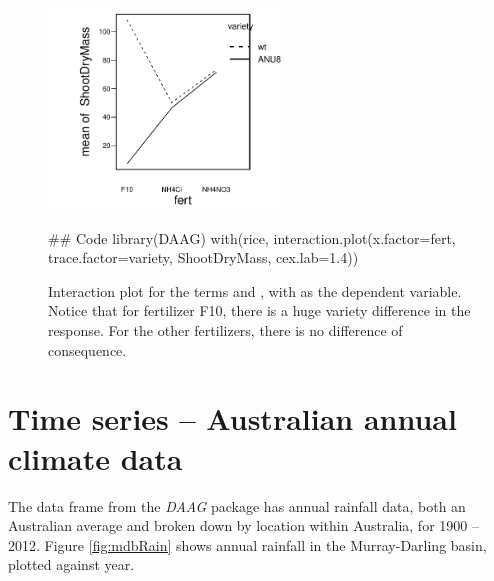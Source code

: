 \begin{figure}
\begin{Schunk}


\centerline{\includegraphics[width=0.55\textwidth]{figs/05-do-interact-1} }

\end{Schunk}
    \caption{Interaction plot for the terms  and
      , with  as the dependent
      variable. Notice that for fertilizer F10, there is a huge
      variety difference in the response. For the other fertilizers,
      there is no difference of consequence.\label{fig:rice-interact}}
\begin{Schunk}
\begin{Sinput}
## Code
library(DAAG)
with(rice, interaction.plot(x.factor=fert,
                            trace.factor=variety,
                            ShootDryMass,
                            cex.lab=1.4))
\end{Sinput}
\end{Schunk}
\end{figure}

\section{Time series -- Australian annual climate data}

The data frame  from the {\em DAAG} package has
annual rainfall data, both an Australian average and broken down by
location within Australia, for 1900 -- 2012.
Figure \ref{fig:mdbRain} shows annual rainfall in the Murray-Darling
basin, plotted against year.

